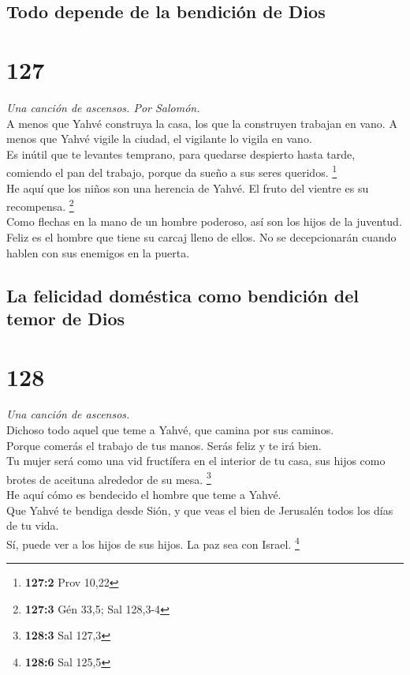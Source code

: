 \hypertarget{todo-depende-de-la-bendiciuxf3n-de-dios}{%
\subsection{Todo depende de la bendición de
Dios}\label{todo-depende-de-la-bendiciuxf3n-de-dios}}

\hypertarget{section-124}{%
\section{127}\label{section-124}}

\emph{Una canción de ascensos. Por Salomón.}\\
 A menos que Yahvé construya la casa, los que la
construyen trabajan en vano. A menos que Yahvé vigile la ciudad, el
vigilante lo vigila en vano.\\
 Es inútil que te levantes temprano, para quedarse
despierto hasta tarde, comiendo el pan del trabajo, porque da sueño a
sus seres queridos. \footnote{\textbf{127:2} Prov 10,22}\\
 He aquí que los niños son una herencia de Yahvé. El fruto
del vientre es su recompensa. \footnote{\textbf{127:3} Gén 33,5; Sal
  128,3-4}\\
 Como flechas en la mano de un hombre poderoso, así son
los hijos de la juventud.\\
 Feliz es el hombre que tiene su carcaj lleno de ellos. No
se decepcionarán cuando hablen con sus enemigos en la puerta.

\hypertarget{la-felicidad-domuxe9stica-como-bendiciuxf3n-del-temor-de-dios}{%
\subsection{La felicidad doméstica como bendición del temor de
Dios}\label{la-felicidad-domuxe9stica-como-bendiciuxf3n-del-temor-de-dios}}

\hypertarget{section-125}{%
\section{128}\label{section-125}}

\emph{Una canción de ascensos.}\\
 Dichoso todo aquel que teme a Yahvé, que camina por sus
caminos.\\
 Porque comerás el trabajo de tus manos. Serás feliz y te
irá bien.\\
 Tu mujer será como una vid fructífera en el interior de
tu casa, sus hijos como brotes de aceituna alrededor de su mesa.
\footnote{\textbf{128:3} Sal 127,3}\\
 He aquí cómo es bendecido el hombre que teme a Yahvé.\\
 Que Yahvé te bendiga desde Sión, y que veas el bien de
Jerusalén todos los días de tu vida.\\
 Sí, puede ver a los hijos de sus hijos. La paz sea con
Israel. \footnote{\textbf{128:6} Sal 125,5}

